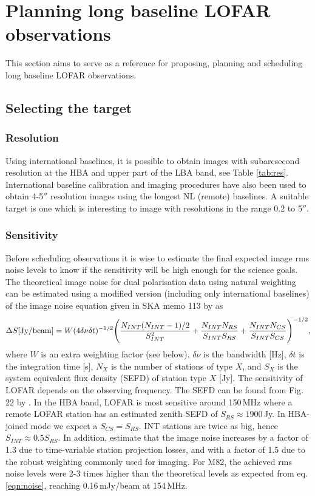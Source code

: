 \section{Planning long baseline LOFAR observations}
\label{sect:sched}
This section aims to serve as a reference for proposing, planning and
scheduling long baseline LOFAR observations. 

\subsection{Selecting the target}
\subsubsection{Resolution}
Using international baselines, it is possible to obtain images with
subarcsecond resolution at the HBA and upper part of the LBA band, see Table
\ref{tab:res}. International baseline calibration and imaging procedures have
also been used to obtain 4-5$''$ resolution images using the longest NL
(remote) baselines. A suitable target is one which is interesting to image
with resolutions in the range 0.2 to 5$''$.

\subsubsection{Sensitivity}
Before scheduling observations it is wise to estimate the final expected
image rms noise levels to know if the sensitivity will be high enough for the
science goals. 
The theoretical image noise for dual polarisation data using natural weighting
can be estimated using a modified version (including only international
baselines) of the image noise equation given in SKA memo 113 by \cite{skamemo113} as
\begin{equation}
\Delta S[\mathrm{Jy}/\mathrm{beam}]=W(4\delta\nu\delta t)^{-1/2}\Bigg(
\frac{N_{INT}(N_{INT}-1)/2}{S^2_{INT}}+\\
        \frac{N_{INT}N_{RS}}{S_{INT}S_{RS}}+
        \frac{N_{INT}N_{CS}}{S_{INT}S_{CS}}
    \Bigg)^{-1/2},
    \label{eqn:noise}
\end{equation}
where $W$ is an extra weighting factor (see below), $\delta\nu$ is the
bandwidth [Hz], $\delta t$ is the integration time [s], $N_{X}$ is the number
of stations of type $X$, and $S_{X}$ is the system equivalent flux density
(SEFD) of station type $X$ [Jy]. The sensitivity of LOFAR depends on the
observing frequency.  The SEFD can be found from Fig. 22 by
\cite{vanhaarlem2013}. In the HBA band, LOFAR is most sensitive around 150\,MHz
where a remote LOFAR station has an estimated zenith SEFD of
$S_{RS}\approx1900$\,Jy. In HBA-joined mode we expect a $S_{CS}=S_{RS}$.  INT
stations are twice as big, hence $S_{INT}\approx0.5S_{RS}$.  In addition,
\cite{vanhaarlem2013} estimate that the image noise increases by a factor of 1.3
due to time-variable station projection losses, and with a factor of 1.5 due to
the robust weighting commonly used for imaging.  For M82, the achieved rms
noise levels were 2-3 times higher than the theoretical levels as expected from
eq. \ref{eqn:noise}, reaching 0.16\,mJy/beam at 154\,MHz. 

